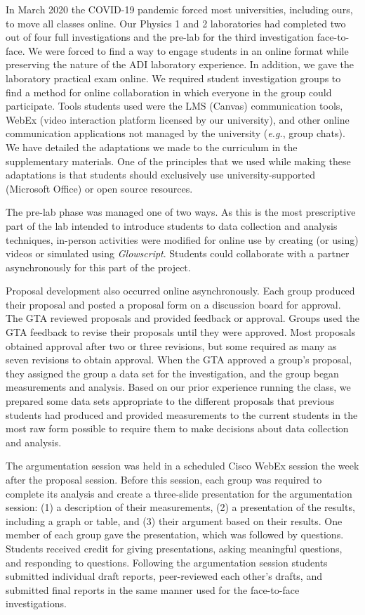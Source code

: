 \documentclass[aip, numerical, preprint]{revtex4-2}
\begin{document}
In March 2020 the COVID-19 pandemic forced most universities, including ours, to move all
classes online. Our Physics 1 and 2 laboratories had completed two out of
four full investigations and the pre-lab for the third investigation face-to-face. We were
forced to find a way to engage students in an online format while preserving the nature of the
ADI laboratory experience. In addition, we gave the laboratory practical exam online. We
required student investigation groups to find a method for online collaboration in which
everyone in the group could participate. Tools students used were the LMS (Canvas)
communication tools, WebEx (video interaction platform licensed by our university),
and other online communication applications not managed by the university (\emph{e.g.}, group
chats). We have detailed the adaptations we made to the curriculum in the supplementary
materials.  One of the principles that we used while making these adaptations is that students
should exclusively use university-supported (Microsoft Office) or open source resources.

The pre-lab phase was managed one of two ways.  As this is the most prescriptive part of the lab intended to introduce students to data collection and analysis techniques, in-person
activities were modified for online use by creating (or using) videos or simulated using
\emph{Glowscript}.\citep{glowscript} Students could collaborate with a partner asynchronously
for this part of the project.

Proposal development also occurred online asynchronously.  Each group produced their proposal
and posted a proposal form on a discussion board for approval. The GTA reviewed proposals and
provided feedback or approval. Groups used the GTA feedback to revise their proposals until
they were approved. Most proposals obtained approval after two or three revisions, but some
required as many as seven revisions to obtain approval. When the GTA approved a group's
proposal, they assigned the group a data set for the investigation, and the group began
measurements and analysis. Based on our prior experience running the class, we prepared some
data sets appropriate to the different proposals that previous students had produced and
provided measurements to the current students in the most raw form possible to require them to
make decisions about data collection and analysis.

The argumentation session was held in a scheduled Cisco WebEx session
the week after the proposal session. Before this session, each group was required to complete
its analysis and create a three-slide presentation for the argumentation session: (1) a description of their measurements, (2) a presentation of the
results, including a graph or table, and (3) their argument based on their
results.  One member of each group gave the presentation, which was followed by
questions. Students received credit for giving presentations, asking meaningful questions, and
responding to questions.  Following the argumentation session students submitted individual
draft reports, peer-reviewed each other's drafts, and submitted final reports in the same
manner used for the face-to-face investigations.
\end{document}
